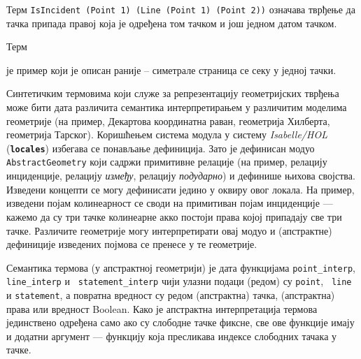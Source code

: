 \begin{primer}
Терм {\tt IsIncident (Point 1) (Line (Point 1) (Point 2))} означава
тврђење да тачка припада правој која је одређена том тачком и још
једном датом тачком.
\end{primer}

\newpage

\begin{primer}
Терм
је пример који је описан раније -- симетрале страница се секу у једној
тачки.
\end{primer}

Синтетичким термовима који служе за репрезентацију геометријских
тврђења може бити дата различита семантика интерпретирањем у
различитим моделима геометрије (на пример, Декартова координатна
раван, геометрија Хилберта, геометрија Тарског). Коришћењем система
модула у систему \emph{Isabelle/HOL} ({\tt \textbf{locales}}) избегава
се понављање дефиниција. Зато је дефинисан модуо {\tt
  AbstractGeometry} који садржи примитивне релације (на пример,
релацију инциденције, релацију \emph{између}, релацију
\emph{подударно}) и дефинише њихова својства. Изведени концепти се
могу дефинисати једино у оквиру овог локала. На пример, изведени појам
колинеарност се своди на примитиван појам инциденције --- кажемо да су
три тачке колинеарне акко постоји права којој припадају све три
тачке. Различите геометрије могу интерпретирати овај модуо и
(апстрактне) дефиниције изведених појмова се пренесе у те геометрије.

\begin{sloppypar}
Семантика термова (у апстрактној геометрији) је дата функцијама
\mbox{{\tt point\_interp}}, {\tt line\_interp} и {\tt
  statement\_interp} чији улазни подаци (редом) су {\tt point}, {\tt
  line} и {\tt statement}, а повратна вредност су редом (апстрактна)
тачка, (апстрактна) права или вредност Boolean. Како је апстрактна
интерпретација термова јединствено одређена само ако су слободне тачке
фиксне, све ове функције имају и додатни аргумент --- функцију која
пресликава индексе слободних тачака у тачке.
\end{sloppypar}


